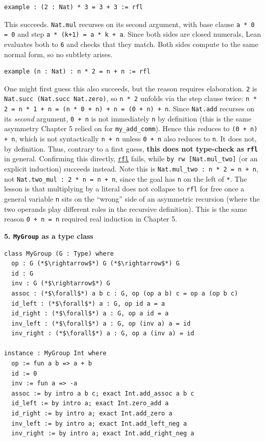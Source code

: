 \begin{lstlisting}
example : (2 : Nat) * 3 = 3 + 3 := rfl
\end{lstlisting}

This succeeds. \texttt{Nat.mul} recurses on its second argument, with base clause \texttt{a * 0 = 0} and step \texttt{a * (k+1) = a * k + a}. Since both sides are closed numerals, Lean evaluates both to \texttt{6} and checks that they match. Both sides compute to the same normal form, so no subtlety arises.

\begin{lstlisting}
example (n : Nat) : n * 2 = n + n := rfl
\end{lstlisting}

One might first guess this also succeeds, but the reason requires elaboration. \texttt{2} is \texttt{Nat.succ (Nat.succ Nat.zero)}, so \texttt{n * 2} unfolds via the step clause twice: \texttt{n * 2 = n * 1 + n = (n * 0 + n) + n = (0 + n) + n}. Since \texttt{Nat.add} recurses on its \emph{second} argument, \texttt{0 + n} is not immediately \texttt{n} by definition (this is the same asymmetry Chapter 5 relied on for \texttt{my\_\allowbreak{}add\_\allowbreak{}comm}). Hence this reduces to \texttt{(0 + n) + n}, which is not syntactically \texttt{n + n} unless \texttt{0 + n} also reduces to \texttt{n}. It does not, by definition. Thus, contrary to a first guess, \textbf{this does not type-check as \texttt{rfl}} in general. Confirming this directly, \href{https://lean-lang.org/doc/reference/latest/Tactic-Proofs/Tactic-Reference/}{\texttt{rfl}} fails, while \texttt{by rw [Nat.mul\_\allowbreak{}two]} (or an explicit induction) succeeds instead. Note this is \texttt{Nat.mul\_\allowbreak{}two : n * 2 = n + n}, not \texttt{Nat.two\_\allowbreak{}mul : 2 * n = n + n}, since the goal has \texttt{n} on the left of \texttt{*}. The lesson is that multiplying by a literal does not collapse to \texttt{rfl} for free once a general variable \texttt{n} sits on the ``wrong'' side of an asymmetric recursion (where the two operands play different roles in the recursive definition). This is the same reason \texttt{0 + n = n} required real induction in Chapter 5.

\textbf{5. \texttt{MyGroup} as a type class}

\begin{lstlisting}
class MyGroup (G : Type) where
  op : G (*$\rightarrow$*) G (*$\rightarrow$*) G
  id : G
  inv : G (*$\rightarrow$*) G
  assoc : (*$\forall$*) a b c : G, op (op a b) c = op a (op b c)
  id_left : (*$\forall$*) a : G, op id a = a
  id_right : (*$\forall$*) a : G, op a id = a
  inv_left : (*$\forall$*) a : G, op (inv a) a = id
  inv_right : (*$\forall$*) a : G, op a (inv a) = id

instance : MyGroup Int where
  op := fun a b => a + b
  id := 0
  inv := fun a => -a
  assoc := by intro a b c; exact Int.add_assoc a b c
  id_left := by intro a; exact Int.zero_add a
  id_right := by intro a; exact Int.add_zero a
  inv_left := by intro a; exact Int.add_left_neg a
  inv_right := by intro a; exact Int.add_right_neg a
\end{lstlisting}

